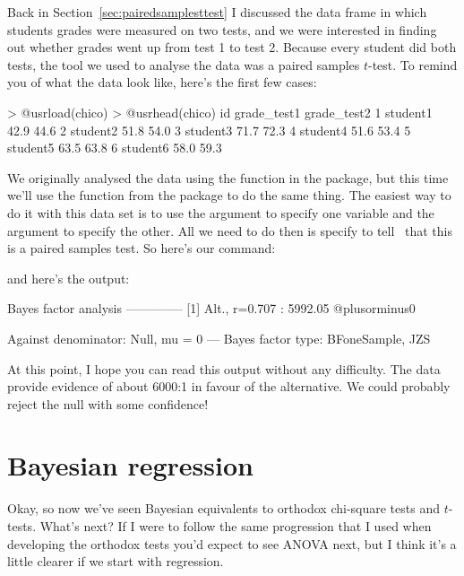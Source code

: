 
Back in Section~\ref{sec:pairedsamplesttest} I discussed the  data frame in which students grades were measured on two tests, and we were interested in finding out whether grades went up from test 1 to test 2. Because every student did both tests, the tool we used to analyse the data was a paired samples $t$-test. To remind you of what the data look like, here's the first few cases:
\begin{rblock1}
> @usr{load(chico)}
> @usr{head(chico)}
        id grade_test1 grade_test2
1 student1        42.9        44.6
2 student2        51.8        54.0
3 student3        71.7        72.3
4 student4        51.6        53.4
5 student5        63.5        63.8
6 student6        58.0        59.3
\end{rblock1}
We originally analysed the data using the  function in the  package, but this time we'll use the  function from the  package to do the same thing. The easiest way to do it with this data set is to use the  argument to specify one variable and the  argument to specify the other. All we need to do then is specify  to tell \R\ that this is a paired samples test. So here's our command:
and here's the output:
\begin{rblock1}
Bayes factor analysis
--------------
[1] Alt., r=0.707 : 5992.05 @plusorminus0%

Against denominator:
  Null, mu = 0 
---
Bayes factor type: BFoneSample, JZS
\end{rblock1}
At this point, I hope you can read this output without any difficulty. The data provide evidence of about 6000:1 in favour of the alternative. We could probably reject the null with some confidence!



\section{Bayesian regression~\label{sec:bayesregression}}

Okay, so now we've seen Bayesian equivalents to orthodox chi-square tests and $t$-tests. What's next? If I were to follow the same progression that I used when developing the orthodox tests you'd expect to see ANOVA next, but I think it's a little clearer if we start with regression. 

